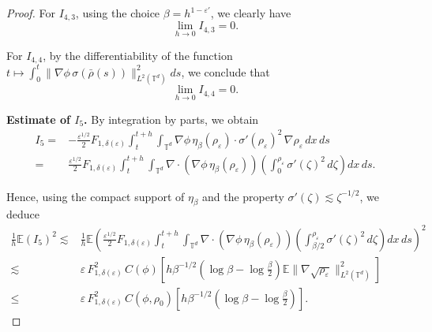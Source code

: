 \documentclass[UTF-8,reqno]{amsart}
\numberwithin{equation}{section}
\def\leq{\leqslant}
\def\leq{\leqslant}
\begin{document}
\begin{proof}
For $I_{4,3}$, using the choice $\beta = h^{1 - \varepsilon'}$, we clearly have
$$
\lim_{h \to 0} I_{4,3} = 0.
$$

For $I_{4,4}$, by the differentiability of the function $ t \mapsto \int_0^t \|\nabla\phi\,\sigma(\bar{\rho}(s))\|_{L^2(\mathbb{T}^d)}^2 ds $, we conclude that
$$
\lim_{h \to 0} I_{4,4} = 0.
$$

\bigskip

\noindent\textbf{Estimate of $ I_5 $.} By integration by parts, we obtain
\begin{align*}
I_5=& -\frac{\varepsilon^{1/2}}{2}F_{1,\delta(\varepsilon)} \int_t^{t+h} \int_{\mathbb{T}^d} \nabla\phi\,\eta_{\beta}(\rho_{\varepsilon}) \cdot \sigma'(\rho_{\varepsilon})^2\,\nabla\rho_{\varepsilon}\,dx\,ds \\
=& \frac{\varepsilon^{1/2}}{2}F_{1,\delta(\varepsilon)} \int_t^{t+h} \int_{\mathbb{T}^d} \nabla\cdot(\nabla\phi\,\eta_{\beta}(\rho_{\varepsilon})) \left( \int_0^{\rho_{\varepsilon}} \sigma'(\zeta)^2\,d\zeta \right) dx\,ds. 
\end{align*}

Hence, using the compact support of $\eta_{\beta}$ and the property $\sigma'(\zeta) \lesssim \zeta^{-1/2}$, we deduce
\begin{align*}
\frac{1}{h}\mathbb{E}(I_5)^2\lesssim& \frac{1}{h} \mathbb{E} \left( \frac{\varepsilon^{1/2}}{2}F_{1,\delta(\varepsilon)} \int_t^{t+h} \int_{\mathbb{T}^d} \nabla\cdot(\nabla\phi\,\eta_{\beta}(\rho_{\varepsilon})) \left( \int_{\beta/2}^{\rho_{\varepsilon}} \sigma'(\zeta)^2\,d\zeta \right) dx\,ds \right)^2 \\
\lesssim& \varepsilon\,F_{1,\delta(\varepsilon)}^2\,C(\phi)\left[ h\beta^{-1/2} (\log\beta - \log\frac{\beta}{2}) \mathbb{E}\|\nabla\sqrt{\rho_{\varepsilon}}\|_{L^2(\mathbb{T}^d)}^2 \right] \\
\leq& \varepsilon\,F_{1,\delta(\varepsilon)}^2\,C(\phi,\rho_0)\left[ h\beta^{-1/2} (\log\beta - \log\frac{\beta}{2}) \right].
\end{align*}


\end{proof}
\end{document}
